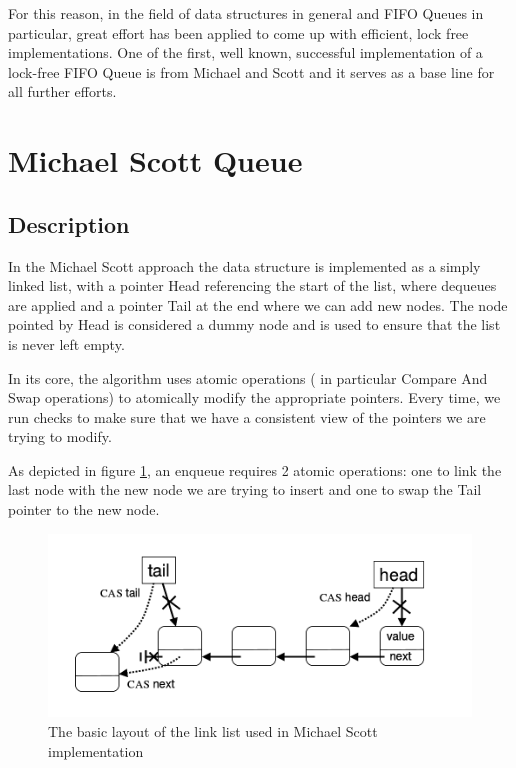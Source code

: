 For this reason, in the field of data structures in general and FIFO Queues in particular, great effort has been applied to come up with efficient, lock free implementations. One of the first, well known, successful implementation of a lock-free FIFO Queue is from Michael and Scott \cite{msqueue} and it serves as a base line for all further efforts.

\section{Michael Scott Queue}
\subsection{Description}

In the Michael Scott approach the data structure is implemented as a simply linked list, with a pointer Head referencing the start of the list, where dequeues are applied and a pointer Tail at the end where we can add new nodes. The node pointed by Head is considered a dummy node  and is used to ensure that the list is never left empty.

In its core, the algorithm uses atomic operations ( in particular Compare And Swap operations) to atomically modify the appropriate pointers. Every time, we run checks to make sure that we have a consistent view of the pointers we are trying to modify.

As depicted in figure \ref{ms_queue_struct}, an enqueue requires 2 atomic operations: one to link the last node with the new node we are trying to insert and one to swap the Tail pointer to the new node.

\begin{figure}
 \centering
  \includegraphics[scale=0.4]{msqueue_struct.png}
\caption{ The basic layout of the link list used in Michael Scott implementation}
\label{ms_queue_struct}
\end{figure}

